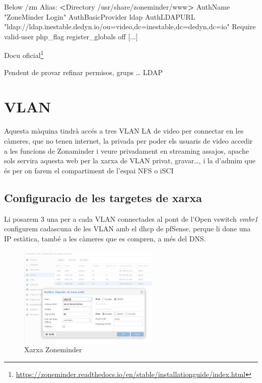 \documentclass[
  10pt,
]{krantz}
\newenvironment{Shaded}{\begin{snugshade}}{\end{snugshade}}
\newcommand{\ExtensionTok}[1]{#1}
\newcommand{\NormalTok}[1]{#1}
\newcommand{\OperatorTok}[1]{\textcolor[rgb]{0.81,0.36,0.00}{\textbf{#1}}}
\newcommand{\StringTok}[1]{\textcolor[rgb]{0.31,0.60,0.02}{#1}}
\DeclareRobustCommand{\href}[2]{#2\footnote{\url{#1}}}
\begin{document}
\begin{Shaded}
\begin{Highlighting}[]
\ExtensionTok{Below}\NormalTok{ /zm Alias:}
\OperatorTok{\textless{}}\NormalTok{Directory }\ExtensionTok{/usr/share/zoneminder/www}\OperatorTok{\textgreater{}}
\ExtensionTok{AuthName} \StringTok{"ZoneMinder Login"}
\ExtensionTok{AuthBasicProvider}\NormalTok{ ldap}
\ExtensionTok{AuthLDAPURL} \StringTok{"ldap://ldap.inestable.dedyn.io/ou=video,dc=inestable,dc=dedyn,dc=io"}
\ExtensionTok{Require}\NormalTok{ valid{-}user}
\ExtensionTok{php\_flag}\NormalTok{ register\_globals off}
\ExtensionTok{[...]}
\end{Highlighting}
\end{Shaded}

\href{https://zoneminder.readthedocs.io/en/stable/installationguide/index.html}{Docu oficial}

\begin{rmdinfo}{}
Pendent de provar refinar permisos, grups \ldots{} LDAP

\end{rmdinfo}

\hypertarget{vlan}{%
\section{VLAN}\label{vlan}}

Aquesta màquina tindrà accés a tres VLAN LA de video per connectar en les càmeres, que no tenen internet, la privada per poder els usuaris de video accedir a les funcions de Zonaminder i veure privadament en streaming assajos, apache sols servira aquesta web per la xarxa de VLAN privat, gravar\ldots, i la d'admim que és per on farem el compartiment de l'espai NFS o iSCI

\hypertarget{configuracio-de-les-targetes-de-xarxa}{%
\subsection{Configuracio de les targetes de xarxa}\label{configuracio-de-les-targetes-de-xarxa}}

Li posarem 3 una per a cada VLAN connectades al pont de l'Open vswitch \emph{vmbr1} configurem cadascuna de les VLAN amb el dhcp de pfSense, perque li done una IP estàtica, també a les càmeres que es compren, a més del DNS.

\begin{figure}
\centering
\includegraphics[width=0.6\textwidth,height=\textheight]{imatges/proxmox/zoneminder_xarxa.png}
\caption{Xarxa Zoneminder}
\end{figure}
\end{document}
